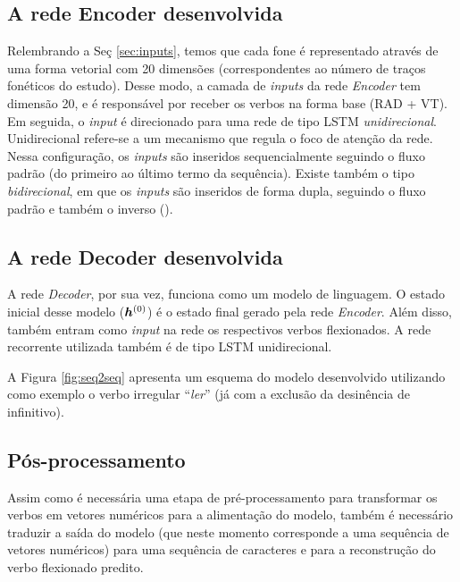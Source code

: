 \subsection{A rede Encoder desenvolvida}

Relembrando a Seç \ref{sec:inputs}, temos que cada fone é representado através de uma forma vetorial com 20 dimensões (correspondentes ao número de traços fonéticos do estudo). Desse modo, a camada de \textit{inputs} da rede \textit{Encoder} tem dimensão 20, e é responsável por receber os verbos na forma base (RAD + VT). Em seguida, o \textit{input} é direcionado para uma rede de tipo LSTM \textit{unidirecional}. Unidirecional refere-se a um mecanismo que regula o foco de atenção da rede. Nessa configuração, os \textit{inputs} são inseridos sequencialmente seguindo o fluxo padrão (do primeiro ao último termo da sequência). Existe também o tipo \textit{bidirecional}, em que os \textit{inputs} são inseridos de forma dupla, seguindo o fluxo padrão e também o inverso (\cite{schuster1997bidirectional}).


\subsection{A rede Decoder desenvolvida}

A rede \textit{Decoder}, por sua vez, funciona como um modelo de linguagem. O estado inicial desse modelo ($\bm{h}^{(0)}$) é o estado final gerado pela rede \textit{Encoder}. Além disso, também entram como \textit{input} na rede os respectivos verbos flexionados. A rede recorrente utilizada também é de tipo LSTM unidirecional.

A Figura \ref{fig:seq2seq} apresenta um esquema do modelo desenvolvido utilizando como exemplo o verbo irregular “\textit{ler}” (já com a exclusão da desinência de infinitivo).




 \subsection{Pós-processamento}

Assim como é necessária uma etapa de pré-processamento para transformar os verbos em vetores numéricos para a alimentação do modelo, também é necessário traduzir a saída do modelo (que neste momento corresponde a uma sequência de vetores numéricos) para uma sequência de caracteres e para a reconstrução do verbo flexionado predito.

